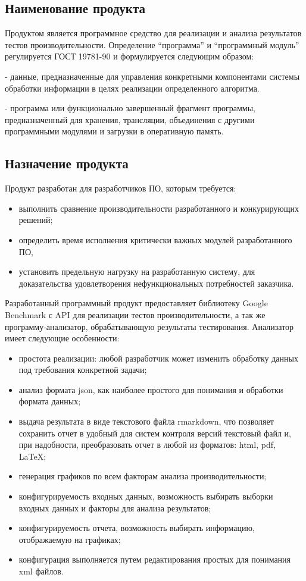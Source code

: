 \subsection{Наименование продукта}
	Продуктом является программное средство для реализации и анализа результатов тестов производительности. Определение \enquote{программа} и \enquote{программный модуль} регулируется ГОСТ 19781-90 и формулируется следующим образом:
	\begin{description}[noitemsep]
		\item [Программа] - данные, предназначенные для управления конкретными компонентами системы обработки информации в целях реализации определенного алгоритма.
		\item [Программный модуль] - программа или функционально завершенный фрагмент программы, предназначенный для хранения, трансляции, объединения с другими программными модулями и загрузки в оперативную память.
	\end{description}
%
\subsection{Назначение продукта} \label{subseq:products_purpose}
	Продукт разработан для разработчиков ПО, которым требуется:
	\begin{itemize}[noitemsep]
		\item выполнить сравнение производительности разработанного и конкурирующих решений;
		\item определить время исполнения критически важных модулей разработанного ПО,
		\item установить предельную нагрузку на разработанную систему, для доказательства удовлетворения нефункциональных потребностей заказчика.
	\end{itemize}
	Разработанный программный продукт предоставляет библиотеку Google Benchmark с API для реализации тестов производительности, а так же программу-анализатор, обрабатывающую результаты тестирования. Анализатор имеет следующие особенности:
	\begin{itemize}[noitemsep]
		\item простота реализации: любой разработчик может изменить обработку данных под требования конкретной задачи;
		\item анализ формата json, как наиболее простого для понимания и обработки формата данных;
		\item выдача результата в виде текстового файла rmarkdown, что позволяет сохранить отчет в удобный для систем контроля версий текстовый файл и, при надобности, преобразовать отчет в любой из форматов: html, pdf, \LaTeX;
		\item генерация графиков по всем факторам анализа производительности;
		\item конфигурируемость входных данных, возможность выбирать выборки входных данных и факторы для анализа результатов;
		\item конфигурируемость отчета, возможность выбирать информацию, отображаемую на графиках;
		\item конфигурация выполняется путем редактирования простых для понимания xml файлов.
	\end{itemize}

